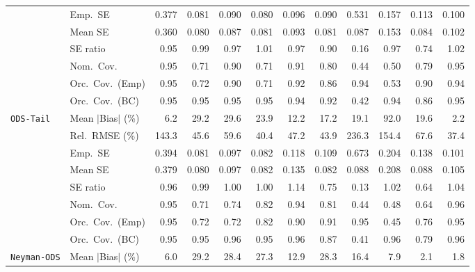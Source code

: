 \begin{landscape}
\begin{longtable}{llrrrrrrrrrr}
 & Emp.\ SE & 0.377 & 0.081 & 0.090 & 0.080 & 0.096 & 0.090 & 0.531 & 0.157 & 0.113 & 0.100 \\
 & Mean SE & 0.360 & 0.080 & 0.087 & 0.081 & 0.093 & 0.081 & 0.087 & 0.153 & 0.084 & 0.102 \\
 & SE ratio & 0.95 & \cellcolor{rankone}0.99 & 0.97 & \cellcolor{ranktwo}1.01 & 0.97 & 0.90 & 0.16 & 0.97 & 0.74 & \cellcolor{rankthree}1.02 \\
 & Nom.\ Cov. & \cellcolor{ranktwo}0.95 & 0.71 & 0.90 & 0.71 & \cellcolor{rankthree}0.91 & 0.80 & 0.44 & 0.50 & 0.79 & \cellcolor{rankone}0.95 \\
 & Orc.\ Cov.\ (Emp) & \cellcolor{rankone}0.95 & 0.72 & 0.90 & 0.71 & 0.92 & 0.86 & \cellcolor{rankthree}0.94 & 0.53 & 0.90 & \cellcolor{ranktwo}0.94 \\
 & Orc.\ Cov.\ (BC) & 0.95 & \cellcolor{rankthree}0.95 & \cellcolor{rankone}0.95 & 0.95 & 0.94 & 0.92 & 0.42 & 0.94 & 0.86 & \cellcolor{ranktwo}0.95 \\
\addlinespace[2pt]
\quad \texttt{ODS-Tail} & Mean $|$Bias$|$ (\%) & \cellcolor{ranktwo}6.2 & 29.2 & 29.6 & 23.9 & \cellcolor{rankthree}12.2 & 17.2 & 19.1 & 92.0 & 19.6 & \cellcolor{rankone}2.2 \\
 & Rel.\ RMSE (\%) & 143.3 & 45.6 & 59.6 & \cellcolor{ranktwo}40.4 & 47.2 & \cellcolor{rankthree}43.9 & 236.3 & 154.4 & 67.6 & \cellcolor{rankone}37.4 \\
 & Emp.\ SE & 0.394 & 0.081 & 0.097 & 0.082 & 0.118 & 0.109 & 0.673 & 0.204 & 0.138 & 0.101 \\
 & Mean SE & 0.379 & 0.080 & 0.097 & 0.082 & 0.135 & 0.082 & 0.088 & 0.208 & 0.088 & 0.105 \\
 & SE ratio & 0.96 & \cellcolor{rankthree}0.99 & \cellcolor{rankone}1.00 & \cellcolor{ranktwo}1.00 & 1.14 & 0.75 & 0.13 & 1.02 & 0.64 & 1.04 \\
 & Nom.\ Cov. & \cellcolor{rankone}0.95 & 0.71 & 0.74 & 0.82 & \cellcolor{ranktwo}0.94 & 0.81 & 0.44 & 0.48 & 0.64 & \cellcolor{rankthree}0.96 \\
 & Orc.\ Cov.\ (Emp) & \cellcolor{rankone}0.95 & 0.72 & 0.72 & 0.82 & 0.90 & 0.91 & \cellcolor{rankthree}0.95 & 0.45 & 0.76 & \cellcolor{ranktwo}0.95 \\
 & Orc.\ Cov.\ (BC) & \cellcolor{rankone}0.95 & \cellcolor{ranktwo}0.95 & 0.96 & \cellcolor{rankthree}0.95 & 0.96 & 0.87 & 0.41 & 0.96 & 0.79 & 0.96 \\
\addlinespace[2pt]
\quad \texttt{Neyman-ODS} & Mean $|$Bias$|$ (\%) & \cellcolor{rankthree}6.0 & 29.2 & 28.4 & 27.3 & 12.9 & 28.3 & 16.4 & 7.9 & \cellcolor{ranktwo}2.1 & \cellcolor{rankone}1.8 \\

\end{longtable}
\end{landscape}
